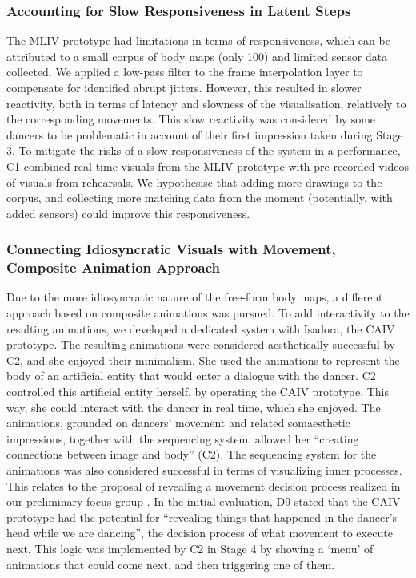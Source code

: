 \subsubsection{Accounting for Slow Responsiveness in Latent Steps}

The MLIV prototype had limitations in terms of responsiveness, which can be attributed to a small corpus of body maps (only 100) and limited sensor data collected. We applied a low-pass filter to the frame interpolation layer to compensate for identified abrupt jitters. However, this resulted in slower reactivity, both in terms of latency and slowness of the visualisation, relatively to the corresponding movements. This slow reactivity was considered by some dancers to be problematic in account of their first impression taken during Stage 3. To mitigate the risks of a slow responsiveness of the system in a performance, C1 combined real time visuals from the MLIV prototype with pre-recorded videos of visuals from rehearsals. We hypothesise that adding more drawings to the corpus, and collecting more matching data from the moment (potentially, with added sensors) could improve this responsiveness.

\subsubsection{Connecting Idiosyncratic Visuals with Movement, Composite Animation Approach}

Due to the more idiosyncratic nature of the free-form body maps, a different approach based on composite animations was pursued. To add interactivity to the resulting animations, we developed a dedicated system with Isadora, the CAIV prototype. The resulting animations were considered aesthetically successful by C2, and she enjoyed their minimalism. She used the animations to represent the body of an artificial entity that would enter a dialogue with the dancer. C2 controlled this artificial entity herself, by operating the CAIV prototype. This way, she could interact with the dancer in real time, which she enjoyed. The animations, grounded on dancers’ movement and related somaesthetic impressions, together with the sequencing system, allowed her “creating connections between image and body” (C2). The sequencing system for the animations was also considered successful in terms of visualizing inner processes. This relates to the proposal of revealing a movement decision process realized in our preliminary focus group \cite{masu_how_2019}. In the initial evaluation, D9 stated that the CAIV prototype had the potential for “revealing things that happened in the dancer’s head while we are dancing”, the decision process of what movement to execute next. This logic was implemented by C2 in Stage 4 by showing a ‘menu’ of animations that could come next, and then triggering one of them.

